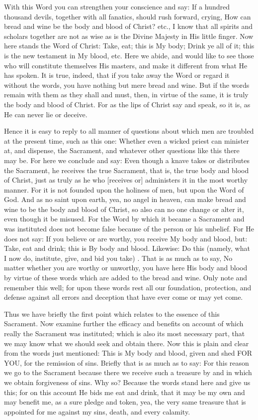 With this Word you can strengthen your conscience and say: If a
hundred thousand devils, together with all fanatics, should rush
forward, crying, How can bread and wine be the body and blood of
Christ? etc., I know that all spirits and scholars together are not as
wise as is the Divine Majesty in His little finger. Now here stands the
Word of Christ: Take, eat; this is My body; Drink ye all of it; this is
the new testament in My blood, etc. Here we abide, and would like to
see those who will constitute themselves His masters, and make it
different from what He has spoken. It is true, indeed, that if you take
away the Word or regard it without the words, you have nothing but mere
bread and wine. But if the words remain with them as they shall and
must, then, in virtue of the same, it is truly the body and blood of
Christ. For as the lips of Christ say and speak, so it is, as He can
never lie or deceive.

Hence it is easy to reply to all manner of questions about which men
are troubled at the present time, such as this one: Whether even a
wicked priest can minister at, and dispense, the Sacrament, and
whatever other questions like this there may be. For here we conclude
and say: Even though a knave takes or distributes the Sacrament, he
receives the true Sacrament, that is, the true body and blood of
Christ, just as truly as he who [receives or] administers it in the
most worthy manner. For it is not founded upon the holiness of men, but
upon the Word of God. And as no saint upon earth, yea, no angel in
heaven, can make bread and wine to be the body and blood of Christ, so
also can no one change or alter it, even though it be misused. For the
Word by which it became a Sacrament and was instituted does not become
false because of the person or his unbelief. For He does not say: If
you believe or are worthy, you receive My body and blood, but: Take,
eat and drink; this is By body and blood. Likewise: Do this (namely,
what I now do, institute, give, and bid you take) . That is as much as
to say, No matter whether you are worthy or unworthy, you have here His
body and blood by virtue of these words which are added to the bread
and wine. Only note and remember this well; for upon these words rest
all our foundation, protection, and defense against all errors and
deception that have ever come or may yet come.

Thus we have briefly the first point which relates to the essence of
this Sacrament. Now examine further the efficacy and benefits on
account of which really the Sacrament was instituted; which is also its
most necessary part, that we may know what we should seek and obtain
there. Now this is plain and clear from the words just mentioned: This
is My body and blood, given and shed FOR YOU, for the remission of
sins. Briefly that is as much as to say: For this reason we go to the
Sacrament because there we receive such a treasure by and in which we
obtain forgiveness of sins. Why so? Because the words stand here and
give us this; for on this account He bids me eat and drink, that it may
be my own and may benefit me, as a sure pledge and token, yea, the very
same treasure that is appointed for me against my sins, death, and
every calamity.

